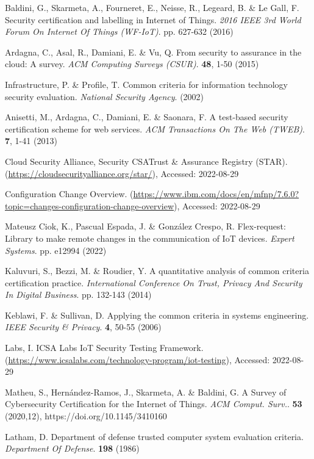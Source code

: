 Baldini, G., Skarmeta, A., Fourneret, E., Neisse, R., Legeard, B. \& Le Gall, F. Security certification and labelling in Internet of Things. {\em 2016 IEEE 3rd World Forum On Internet Of Things (WF-IoT)}. pp. 627-632 (2016)

Ardagna, C., Asal, R., Damiani, E. \& Vu, Q. From security to assurance in the cloud: A survey. {\em ACM Computing Surveys (CSUR)}. \textbf{48}, 1-50 (2015)

Infrastructure, P. \& Profile, T. Common criteria for information technology security evaluation. {\em National Security Agency}. (2002)

Anisetti, M., Ardagna, C., Damiani, E. \& Saonara, F. A test-based security certification scheme for web services. {\em ACM Transactions On The Web (TWEB)}. \textbf{7}, 1-41 (2013)

Cloud Security Alliance, Security CSATrust \& Assurance Registry (STAR). (\url{https://cloudsecurityalliance.org/star/}), Accessed: 2022-08-29

Configuration Change Overview. (\url{https://www.ibm.com/docs/en/mfnp/7.6.0?topic=changes-configuration-change-overview}), Accessed: 2022-08-29

Mateusz Ciok, K., Pascual Espada, J. \& González Crespo, R. Flex-request: Library to make remote changes in the communication of IoT devices. {\em Expert Systems}. pp. e12994 (2022)

Kaluvuri, S., Bezzi, M. \& Roudier, Y. A quantitative analysis of common criteria certification practice. {\em International Conference On Trust, Privacy And Security In Digital Business}. pp. 132-143 (2014)

Keblawi, F. \& Sullivan, D. Applying the common criteria in systems engineering. {\em IEEE Security \& Privacy}. \textbf{4}, 50-55 (2006)

Labs, I. ICSA Labs IoT Security Testing Framework. (\url{https://www.icsalabs.com/technology-program/iot-testing}), Accessed: 2022-08-29

Matheu, S., Hernández-Ramos, J., Skarmeta, A. \& Baldini, G. A Survey of Cybersecurity Certification for the Internet of Things. {\em ACM Comput. Surv.}. \textbf{53} (2020,12), https://doi.org/10.1145/3410160

Latham, D. Department of defense trusted computer system evaluation criteria. {\em Department Of Defense}. \textbf{198} (1986)

